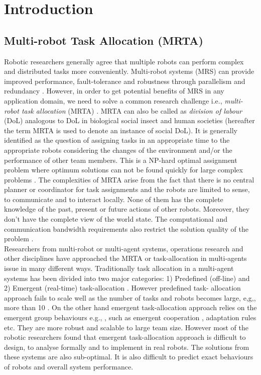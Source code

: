 \chapter{Introduction}
\section{Multi-robot Task Allocation (MRTA)}
Robotic researchers generally agree that multiple robots can perform complex and distributed tasks more conveniently. Multi-robot systems (MRS) can provide improved performance, fault-tolerance and robustness through parallelism and redundancy \cite{Arkin1998,Parker+2006,Mataric2007}. However, in order to get potential benefits of MRS in any application domain, we need to solve a common research challenge i.e., \textit{multi-robot task allocation} (MRTA) \cite{Gerkey+2004}. MRTA can also be called as \textit{division of labour} (DoL) analogous to DoL in biological social insect and human societies (hereafter the term MRTA is used to denote an instance of social DoL). It is generally identified as the question of assigning tasks in an appropriate time to the appropriate robots considering the changes of the environment and/or the performance of other team members. This is a NP-hard optimal assignment problem where optimum solutions can not be found quickly for large complex problems \cite{Gerkey+2003,Parker2008}.
%
The complexities of MRTA arise from the fact that there is no central planner or coordinator for task assignments and the robots are limited to sense, to communicate and to interact locally. None of them has the complete knowledge of the past, present or future actions of other robots. Moreover, they don't have the complete view of the world state. The computational and communication bandwidth requirements also restrict the solution quality of the problem \cite{Lerman+2006}.\\
% 
Researchers from multi-robot or multi-agent systems, operations research and other disciplines have approached the MRTA or task-allocation in multi-agents issue in many different ways. Traditionally task allocation in a multi-agent systems has been divided into two major categories: 1) Predefined (off-line) and 2) Emergent (real-time) task-allocation \cite{Shen+2001}. However predefined task- allocation approach fails to scale well as the number of tasks and robots becomes large, e,g,, more than 10 \cite{Lerman+2006}. On the other hand emergent task-allocation approach relies on the emergent group behaviours e.g., \cite{Kube+1993}, such as emergent cooperation \cite{Lerman+2006}, adaptation rules \cite{Liu+2007} etc. They are more robust and scalable to large team size. However most of the robotic researchers found that emergent task-allocation approach is difficult to design, to analyse formally and to implement in real robots. The solutions from these systems are also sub-optimal. It is also difficult to predict exact behaviours of robots and overall system performance.\\
